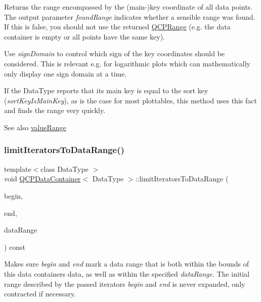 Returns the range encompassed by the (main-\/)key coordinate of all data points. The output parameter {\itshape found\+Range} indicates whether a sensible range was found. If this is false, you should not use the returned \hyperlink{class_q_c_p_range}{Q\+C\+P\+Range} (e.\+g. the data container is empty or all points have the same key).

Use {\itshape sign\+Domain} to control which sign of the key coordinates should be considered. This is relevant e.\+g. for logarithmic plots which can mathematically only display one sign domain at a time.

If the Data\+Type reports that its main key is equal to the sort key ({\itshape sort\+Key\+Is\+Main\+Key}), as is the case for most plottables, this method uses this fact and finds the range very quickly.

\begin{DoxySeeAlso}{See also}
\hyperlink{class_q_c_p_data_container_a35a102dc2424d1228fc374d9313efbe9}{value\+Range} 
\end{DoxySeeAlso}
\mbox{\label{class_q_c_p_data_container_aa1b36f5ae86a5a5a0b92141d3a0945c4}} 
\subsubsection{\texorpdfstring{limit\+Iterators\+To\+Data\+Range()}{limitIteratorsToDataRange()}}
{\footnotesize\ttfamily template$<$class Data\+Type $>$ \\
void \hyperlink{class_q_c_p_data_container}{Q\+C\+P\+Data\+Container}$<$ Data\+Type $>$\+::limit\+Iterators\+To\+Data\+Range (\begin{DoxyParamCaption}\item[{\hyperlink{class_q_c_p_data_container_ae40a91f5cb0bcac61d727427449b7d15}{const\+\_\+iterator} \&}]{begin,  }\item[{\hyperlink{class_q_c_p_data_container_ae40a91f5cb0bcac61d727427449b7d15}{const\+\_\+iterator} \&}]{end,  }\item[{const \hyperlink{class_q_c_p_data_range}{Q\+C\+P\+Data\+Range} \&}]{data\+Range }\end{DoxyParamCaption}) const}

Makes sure {\itshape begin} and {\itshape end} mark a data range that is both within the bounds of this data container\textquotesingle{}s data, as well as within the specified {\itshape data\+Range}. The initial range described by the passed iterators {\itshape begin} and {\itshape end} is never expanded, only contracted if necessary.

